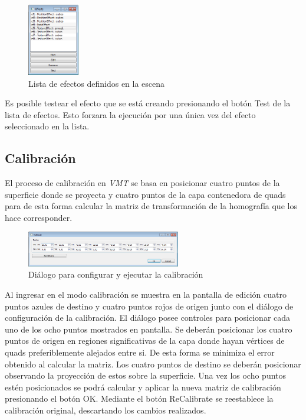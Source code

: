 \begin{figure}[H]
  \centering
    \includegraphics[width=0.2\textwidth]{./Cap5_vmt/vmt_Efects.png}
  \caption{Lista de efectos definidos en la escena}
  \label{fig:VMT-EffectList}
\end{figure}

Es posible testear el efecto que se está creando presionando el botón Test de la lista de efectos. Esto forzara la ejecución por una única vez del efecto seleccionado en la lista.

\subsection{Calibración}

El proceso de calibración en \emph{VMT} se basa en posicionar cuatro puntos de la superficie donde se proyecta y cuatro puntos de la capa contenedora de quads para de esta forma calcular la matriz de transformación de la homografía que los hace corresponder.

\begin{figure}[H]
  \centering
    \includegraphics[width=0.6\textwidth]{./Cap5_vmt/vmt_Calibrate.png}
  \caption{Diálogo para configurar y ejecutar la calibración}
  \label{fig:VMT-Calib}
\end{figure}

Al ingresar en el modo calibración se muestra en la pantalla de edición cuatro puntos azules de destino y cuatro puntos rojos de origen junto con el diálogo de configuración de la calibración.
El diálogo posee controles para posicionar cada uno de los ocho puntos mostrados en pantalla. Se deberán posicionar los cuatro puntos de origen en regiones significativas de la capa donde hayan vértices de quads preferiblemente alejados entre si. De esta forma se minimiza el error obtenido al calcular la matriz.
Los cuatro puntos de destino se deberán posicionar observando la proyección de estos sobre la superficie. Una vez los ocho puntos estén posicionados se podrá calcular y aplicar la nueva matriz de calibración presionando el botón OK.
Mediante el botón ReCalibrate se reestablece la calibración original, descartando los cambios realizados.

